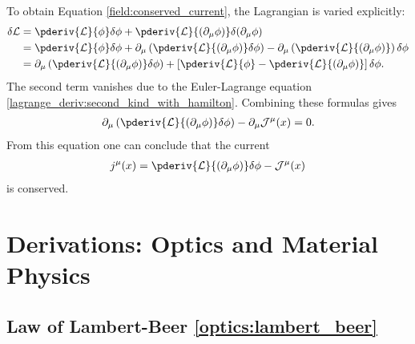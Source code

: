     To obtain Equation \eqref{field:conserved_current}, the Lagrangian is varied explicitly:
    \begin{align*}
        \delta\mathcal{L} &= \pderiv{\mathcal{L}}{\phi}\delta\phi + \pderiv{\mathcal{L}}{(\partial_\mu\phi)}\delta(\partial_\mu\phi)\\
        &= \pderiv{\mathcal{L}}{\phi}\delta\phi + \partial_\mu\left(\pderiv{\mathcal{L}}{(\partial_\mu\phi)}\delta\phi\right) - \partial_\mu\left(\pderiv{\mathcal{L}}{(\partial_\mu\phi)}\right)\delta\phi\\
        &= \partial_\mu\left(\pderiv{\mathcal{L}}{(\partial_\mu\phi)}\delta\phi\right) + \left[\pderiv{\mathcal{L}}{\phi} - \pderiv{\mathcal{L}}{(\partial_\mu\phi)}\right]\delta\phi.
    \end{align*}
    The second term vanishes due to the Euler-Lagrange equation \eqref{lagrange_deriv:second_kind_with_hamilton}. Combining these formulas gives
    \begin{gather}
        \partial_\mu\left(\pderiv{\mathcal{L}}{(\partial_\mu\phi)}\delta\phi\right) - \partial_\mu\mathcal{J}^\mu(x) = 0.
    \end{gather}
    From this equation one can conclude that the current
    \begin{gather}
        j^\mu(x) = \pderiv{\mathcal{L}}{(\partial_\mu\phi)}\delta\phi - \mathcal{J}^\mu(x)
    \end{gather}
    is conserved.


\chapter{Derivations: Optics and Material Physics}

\section{Law of Lambert-Beer \ref{optics:lambert_beer}}

